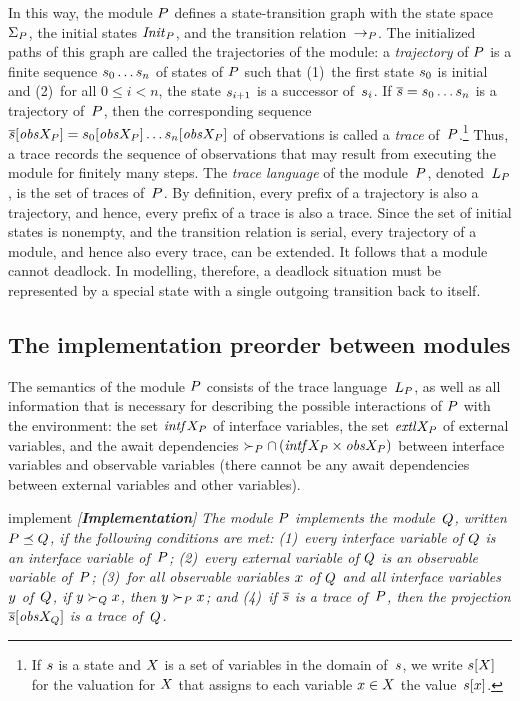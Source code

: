 \mypar
In this way, the module ${P}$ defines a state-transition graph with the state
space~$\Sigma_{P}$, the initial states ${\it Init}_{{P}}$, and the transition
relation~$\rightarrow_{P}$.
The initialized paths of this graph are called the trajectories of the
module:
a {\em trajectory\/} of ${P}$ is a finite sequence $s_0\ldots s_n$
of states of ${P}$ such that
(1)~the first state $s_0$ is initial and
(2)~for all $0\le i<n$, the state $s_{i+1}$ is a successor
  of~$s_i$.
If ${\overline{s}}=s_0\ldots s_n$ is a trajectory of~${P}$, then the
corresponding sequence
${\overline{s}}[{\it obs}X_{{P}}]=s_0[{\it obs}X_{{P}}]\ldots s_n[{\it obs}X_{{P}}]$ of
observations is called a {\em trace\/} of~${P}$.\footnote{
  If $s$ is a state and $X$ is a set of variables in the domain
  of~$s$, we write $s[X]$ for the valuation for $X$ that
  assigns to each variable $x\in X$ the value~$s[x]$.}
Thus, a trace records the sequence of observations that may result
from executing the module for finitely many steps. The {\em trace
language\/} of the module~${P}$, denoted~$L_{{P}}$, is the set
of traces of~${P}$. By definition, every prefix of a trajectory is
also a trajectory, and hence, every prefix of a trace is also a
trace. Since the set of initial states is nonempty, and the
transition relation is serial, every trajectory of a module, and
hence also every trace, can be extended. It follows that a module
cannot deadlock. In modelling, therefore, a deadlock situation
must be represented by a special state with a single outgoing
transition back to itself.


\subsection{The implementation preorder between modules}

The semantics of the module ${P}$ consists of the trace
language~$L_{{P}}$, as well as all information that is necessary for
describing the possible interactions of ${P}$ with the environment:
the set ${\it intf}X_{{P}}$ of interface variables, the set ${\it extl}X_{{P}}$ of external
variables, and the await dependencies
$\succ_{P}\cap\,({\it intf}X_{{P}}\times{\it obs}X_{{P}})$ between interface variables
and observable variables
(there cannot be any await dependencies between external variables and other
variables).

\begin{definition}{implement}\it
  {\em [{\bf Implementation}]}
  The module ${P}$ {\em implements\/} the module~${Q}$, written
  ${P}\preceq{Q}$, if the following conditions are met:
  (1)~every interface variable of ${Q}$ is an interface variable of~${P}$;
  (2)~every external variable of ${Q}$ is an observable variable of~${P}$;
  (3)~for all observable variables $x$ of ${{Q}}$ and all interface
    variables $y$ of~${{Q}}$, if $y\succ_{Q}x$, then
    $y\succ_{P}x$;
    and
  (4)~if ${\overline{s}}$ is a trace of~${P}$, then the projection
    ${\overline{s}}[{\it obs}X_{{Q}}]$ is a trace of~${Q}$.
\end{definition}



